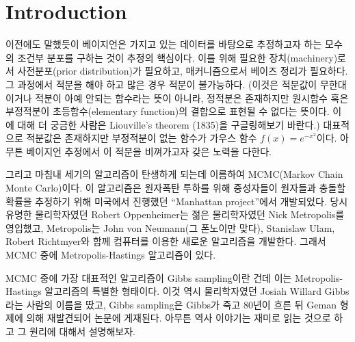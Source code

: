 \documentclass[a4paper, 10pt]{book}
\begin{document}
\section{Introduction}
  이전에도 말했듯이 베이지언은 가지고 있는 데이터를 바탕으로 추정하고자 하는 모수의 조건부 분포를 구하는 것이 추정의 핵심이다. 이를 위해 필요한 장치(machinery)로서 사전분포(prior distribution)가 필요하고, 매커니즘으로서 베이즈 정리가 필요하다. 그 과정에서 적분을 해야 하고 많은 경우 적분이 불가능하다. (이것은 적분값이 무한대이거나 적분이 아예 안되는 함수라는 뜻이 아니라, 정적분은 존재하지만 원시함수 혹은 부정적분이 초등함수(elementary function)의 결합으로 표현될 수 없다는 뜻이다. 이에 대해 더 궁금한 사람은 Liouville's theorem (1835)을 구글링해보기 바란다.) 대표적으로 적분값은 존재하지만 부정적분이 없는 함수가 가우스 함수 $f\left(x\right)= e^{-x^{2}}$이다. 아무튼 베이지언 추정에서 이 적분을 비껴가고자 갖은 노력을 다한다.\par
  그리고 마침내 세기의 알고리즘이 탄생하게 되는데 이름하여 MCMC(Markov Chain Monte Carlo)이다. 이 알고리즘은 원자폭탄 투하를 위해 중성자들이 원자들과 충돌할 확률을 추정하기 위해 미국에서 진행했던 ``Manhattan project''에서 개발되었다\cite{manhattanproject}. 당시 유명한 물리학자였던 Robert Oppenheimer는 젊은 물리학자였던 Nick Metropolis를 영입했고, Metropolis는 John von Neumann(그 폰노이만 맞다), Stanislaw Ulam, Robert Richtmyer와 함께 컴퓨터를 이용한 새로운 알고리즘을 개발한다. 그래서 MCMC 중에 Metropolis-Hastings 알고리즘이 있다.\par
  MCMC 중에 가장 대표적인 알고리즘이 Gibbs sampling이란 건데 이는 Metropolis-Hastings 알고리즘의 특별한 형태이다. 이것 역시 물리학자였던 Josiah Willard Gibbs라는 사람의 이름을 땄고, Gibbs sampling은 Gibbs가 죽고 80년이 흐른 뒤 Geman 형제에 의해 재발견되어 논문에 게재된다. 아무튼 역사 이야기는 재미로 읽는 것으로 하고 그 원리에 대해서 설명해보자.
\end{document}
